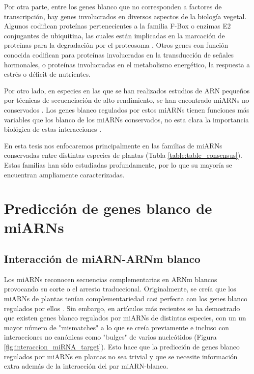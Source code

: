 Por otra parte, entre los genes blanco que no corresponden a factores de transcripción, hay genes involucrados en diversos aspectos de la biología vegetal.
Algunos codifican proteínas pertenecientes a la familia F-Box o enzimas E2 conjugantes de ubiquitina, las cuales están implicadas en la marcación de proteínas para la degradación por el proteosoma \citep{pmid19699140}.
Otros genes con función conocida codifican para proteínas involucradas en la transducción de señales hormonales, o proteínas involucradas en el metabolismo energético, la respuesta a estrés o déficit de nutrientes.

Por otro lado, en especies en las que se han realizados estudios de ARN pequeños por técnicas de secuenciación de alto rendimiento, se han encontrado miARNs no conservados \citep{citeulike:8816489, Rodriguez2010, Rajagopalan2006}.
Los genes blanco regulados por estos miARNs tienen funciones más variables que los blanco de los miARNs conservados, no esta clara la importancia biológica de estas interacciones \citep{citeulike:8816489}.

En esta tesis nos enfocaremos principalmente en las familias de miARNs conservadas entre distintas especies de plantas (Tabla \ref{table:table_consensus}).
Estas familias han sido estudiadas profundamente, por lo que su mayoría se encuentran ampliamente caracterizadas.


\section{Predicción de genes blanco de miARNs}

\subsection{Interacción de miARN-ARNm blanco}

Los miARNs reconocen secuencias complementarias en ARNm blancos provocando su corte o el arresto traduccional.
Originalmente, se creía que los miARNs de plantas tenían complementariedad casi perfecta con los genes blanco regulados por ellos \citep{pmid19167326,pmid12869753,pmid12242443}.
Sin embargo, en artículos más recientes se ha demostrado que existen genes blanco regulados por miARNs de distintas especies, con un un mayor número de "mismatches" a lo que se creía previamente \citep{German2008} e incluso con interacciones no canónicas como "bulges" de varios nucleótidos \citep{pmid24561804} (Figura \ref{fig:interaccion_miRNA_target}).
Esto hace que la predicción de genes blanco regulados por miARNs en plantas no sea trivial y que se necesite información extra además de la interacción del par miARN-blanco.

